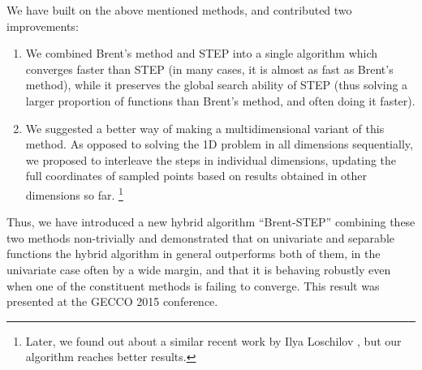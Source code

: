 We have built on the above mentioned methods, and contributed two improvements:

\begin{enumerate}
	\item We combined Brent's method and STEP into a single algorithm which converges faster than STEP (in many cases, it is almost as fast as Brent's method), while it preserves the global search ability of STEP (thus solving a larger proportion of functions than Brent's method, and often doing it faster).

	\item We suggested a better way of making a multidimensional variant of this method. As opposed to solving the 1D problem in all dimensions sequentially, we proposed to interleave the steps in individual dimensions, updating the full coordinates of sampled points based on results obtained in other dimensions so far.%
\footnote{Later, we found out about a similar recent work by Ilya Loschilov \cite{HCMA}, but our algorithm reaches better results.}
\end{enumerate}

Thus, we have introduced a new hybrid algorithm ``Brent-STEP'' combining
these two methods non-trivially and demonstrated that
on univariate and separable functions the hybrid algorithm
in general outperforms both of them,
in the univariate case often by a wide margin,
and that it is behaving robustly even when one of the constituent methods
is failing to converge.
This result was presented at the GECCO 2015 conference.
\citep{Baudis2015GECCO}
